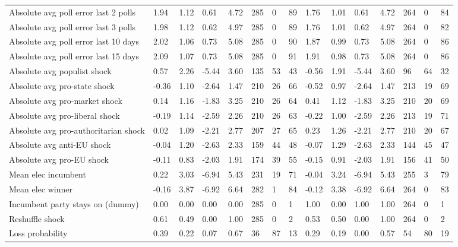 \begin{longtable}{lllllllllllllll}
\addlinespace
Absolute avg poll error last 2 polls & 1.94 & 1.12 & 0.61 & 4.72 & 285 & 0 & 89 & 1.76 & 1.01 & 0.61 & 4.72 & 264 & 0 & 84\\
Absolute avg poll error last 3 polls & 1.98 & 1.12 & 0.62 & 4.97 & 285 & 0 & 89 & 1.76 & 1.01 & 0.62 & 4.97 & 264 & 0 & 82\\
Absolute avg poll error last 10 days & 2.02 & 1.06 & 0.73 & 5.08 & 285 & 0 & 90 & 1.87 & 0.99 & 0.73 & 5.08 & 264 & 0 & 86\\
Absolute avg poll error last 15 days & 2.09 & 1.07 & 0.73 & 5.08 & 285 & 0 & 91 & 1.91 & 0.98 & 0.73 & 5.08 & 264 & 0 & 86\\
Absolute avg populist shock & 0.57 & 2.26 & -5.44 & 3.60 & 135 & 53 & 43 & -0.56 & 1.91 & -5.44 & 3.60 & 96 & 64 & 32\\
\addlinespace
Absolute avg pro-state shock & -0.36 & 1.10 & -2.64 & 1.47 & 210 & 26 & 66 & -0.52 & 0.97 & -2.64 & 1.47 & 213 & 19 & 69\\
Absolute avg pro-market shock & 0.14 & 1.16 & -1.83 & 3.25 & 210 & 26 & 64 & 0.41 & 1.12 & -1.83 & 3.25 & 210 & 20 & 69\\
Absolute avg pro-liberal shock & -0.19 & 1.14 & -2.59 & 2.26 & 210 & 26 & 63 & -0.22 & 1.00 & -2.59 & 2.26 & 213 & 19 & 71\\
Absolute avg pro-authoritarian shock & 0.02 & 1.09 & -2.21 & 2.77 & 207 & 27 & 65 & 0.23 & 1.26 & -2.21 & 2.77 & 210 & 20 & 67\\
Absolute avg anti-EU shock & -0.04 & 1.20 & -2.63 & 2.33 & 159 & 44 & 48 & -0.07 & 1.29 & -2.63 & 2.33 & 144 & 45 & 47\\
\addlinespace
Absolute avg pro-EU shock & -0.11 & 0.83 & -2.03 & 1.91 & 174 & 39 & 55 & -0.15 & 0.91 & -2.03 & 1.91 & 156 & 41 & 50\\
Mean elec incumbent & 0.22 & 3.03 & -6.94 & 5.43 & 231 & 19 & 71 & -0.04 & 3.24 & -6.94 & 5.43 & 255 & 3 & 79\\
Mean elec winner & -0.16 & 3.87 & -6.92 & 6.64 & 282 & 1 & 84 & -0.12 & 3.38 & -6.92 & 6.64 & 264 & 0 & 83\\
Incumbent party stays on (dummy) & 0.00 & 0.00 & 0.00 & 0.00 & 285 & 0 & 1 & 1.00 & 0.00 & 1.00 & 1.00 & 264 & 0 & 1\\
Reshuffle shock & 0.61 & 0.49 & 0.00 & 1.00 & 285 & 0 & 2 & 0.53 & 0.50 & 0.00 & 1.00 & 264 & 0 & 2\\
\addlinespace
Loss probability & 0.39 & 0.22 & 0.07 & 0.67 & 36 & 87 & 13 & 0.29 & 0.19 & 0.00 & 0.57 & 54 & 80 & 19\\

\end{longtable}
